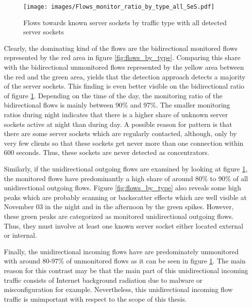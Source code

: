 \begin{figure}[h]
	\centering
	\texttt{[image: images/Flows\_monitor\_ratio\_by\_type\_all\_SeS.pdf]}
	\caption{Flows towards known server sockets by traffic type with all detected server sockets}
	\label{fig:monitored_flows_by_type}
\end{figure}

Clearly, the dominating kind of the flows are the bidirectional monitored flows
represented by the red area in figure \ref{fig:flows_by_type}. Comparing this
share with the bidirectional unmonitored flows represented by the yellow area
between the red and the green area, yields that the detection approach detects a
majority of the \glspl{server socket}. This finding is even better visible on
the bidirectional ratio of figure \ref{fig:monitored_flows_by_type}. Depending
on the time of the day, the monitoring ratio of the bidirectional flows is
mainly between 90\% and 97\%.
The smaller monitoring ratios during night indicates that there is a higher
share of unknown \glspl{server socket} active at night than during day.
A possible reason for pattern is that there are some
\glspl{server socket} which are regularly contacted, although, only by very few
clients so that these sockets get never more than one connection within 600
seconds. Thus, these sockets are never detected as concentrators.

Similarly, if the unidirectional outgoing flows are examined by looking at
figure \ref{fig:monitored_flows_by_type}, the monitored flows have predominantly
a high share of around 80\% to 90\% of all unidirectional outgoing flows. Figure
\ref{fig:flows_by_type} also reveals some high peaks which are probably scanning
or backscatter effects which are well visible at November 03 in the night and in
the afternoon by the green spikes. However, these green peaks are categorized as
monitored unidirectional outgoing flows. Thus, they must involve at least one
known \gls{server socket} either located external or internal.

Finally, the unidirectional incoming flows have are predominately unmonitored
with around 80-97\% of unmonitored flows as it can be seen in figure
\ref{fig:monitored_flows_by_type}. The main reason for this contrast may be that
the main part of this unidirectional incoming traffic consists of Internet
background radiation \citep{Wustrow10,Pang04} due to malware or misconfiguration
for example. Nevertheless, this unidirectional incoming flow traffic is
unimportant with respect to the scope of this thesis.

